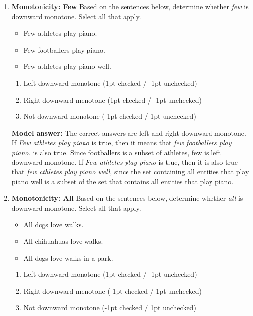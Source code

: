 \documentclass[a4,11pt]{article}
\begin{document}
\begin{enumerate}[leftmargin = 12pt]
\item {\bf Monotonicity: Few} Based on the sentences below, determine whether \textit{few} is downward monotone. Select all that apply. 

\begin{itemize}[noitemsep]
\item Few athletes play piano.
\item Few footballers play piano.
\item Few athletes play piano well.
\end{itemize}

      \begin{enumerate}[noitemsep]
        \item Left downward monotone (1pt checked / -1pt unchecked)
        \item Right downward monotone (1pt checked / -1pt unchecked)
        \item Not downward monotone (-1pt checked / 1pt unchecked)
	\end{enumerate}	

{\bf Model answer:} The correct answers are left and right downward monotone. If \textit{Few athletes play piano} is true, then it means that \textit{few footballers play piano.} is also true. Since footballers is a subset of athletes, few is left downward monotone. If \textit{Few athletes play piano} is true, then it is also true that \textit{few athletes play piano well}, since the set containing all entities that play piano well is a subset of  the set that contains all entities that play piano.


\item {\bf Monotonicity: All} Based on the sentences below, determine whether \textit{all} is downward monotone. Select all that apply. 
\begin{itemize}[noitemsep]
\item All dogs love walks.
\item All chihuahuas love walks.
\item All dogs love walks in a park.
\end{itemize}


      \begin{enumerate}[noitemsep]
        \item Left downward monotone (1pt checked / -1pt unchecked)
        \item Right downward monotone (-1pt checked / 1pt unchecked)
        \item Not downward monotone (-1pt checked / 1pt unchecked)
	\end{enumerate}	
	


\end{enumerate}
\end{document}
